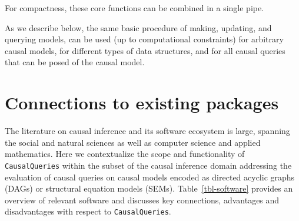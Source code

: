 \documentclass[
  11pt,
  article]{jss}
\begin{document}
For compactness, these core functions can be combined in a single pipe.

As we describe below, the same basic procedure of making, updating, and
querying models, can be used (up to computational constraints) for
arbitrary causal models, for different types of data structures, and for
all causal queries that can be posed of the causal model.

\section{Connections to existing
packages}\label{connections-to-existing-packages}

The literature on causal inference and its software ecosystem is large,
spanning the social and natural sciences as well as computer science and
applied mathematics. Here we contextualize the scope and functionality
of \texttt{CausalQueries} within the subset of the causal inference
domain addressing the evaluation of causal queries on causal models
encoded as directed acyclic graphs (DAGs) or structural equation models
(SEMs). Table~\ref{tbl-software} provides an overview of relevant
software and discusses key connections, advantages and disadvantages
with respect to \texttt{CausalQueries}.
\end{document}
